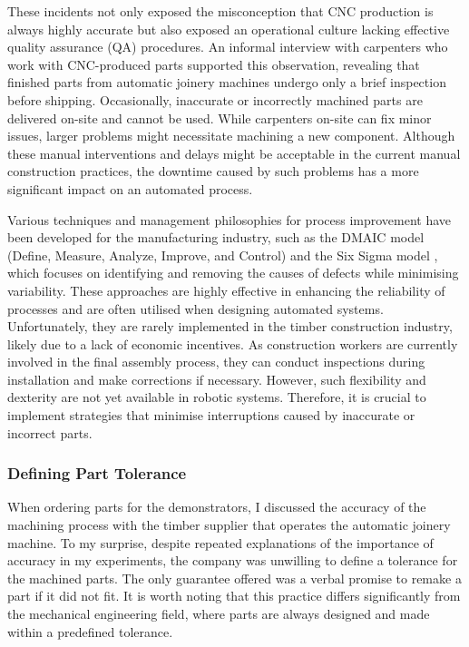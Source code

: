These incidents not only exposed the misconception that CNC production is always highly accurate but also exposed an operational culture lacking effective quality assurance (QA) procedures. An informal interview with carpenters who work with CNC-produced parts supported this observation, revealing that finished parts from automatic joinery machines undergo only a brief inspection before shipping. Occasionally, inaccurate or incorrectly machined parts are delivered on-site and cannot be used. While carpenters on-site can fix minor issues, larger problems might necessitate machining a new component. Although these manual interventions and delays might be acceptable in the current manual construction practices, the downtime caused by such problems has a more significant impact on an automated process.

Various techniques and management philosophies for process improvement have been developed for the manufacturing industry, such as the DMAIC model (Define, Measure, Analyze, Improve, and Control) and the Six Sigma model \parencite{tsungSixSigma2023}, which focuses on identifying and removing the causes of defects while minimising variability. These approaches are highly effective in enhancing the reliability of processes and are often utilised when designing automated systems. Unfortunately, they are rarely implemented in the timber construction industry, likely due to a lack of economic incentives. As construction workers are currently involved in the final assembly process, they can conduct inspections during installation and make corrections if necessary. However, such flexibility and dexterity are not yet available in robotic systems. Therefore, it is crucial to implement strategies that minimise interruptions caused by inaccurate or incorrect parts.

\subsubsection{Defining Part Tolerance}
\label{subsubsection:new-hypo-defining-part-tolerance}

When ordering parts for the demonstrators, I discussed the accuracy of the machining process with the timber supplier that operates the automatic joinery machine. To my surprise, despite repeated explanations of the importance of accuracy in my experiments, the company was unwilling to define a tolerance for the machined parts. The only guarantee offered was a verbal promise to remake a part if it did not fit. It is worth noting that this practice differs significantly from the mechanical engineering field, where parts are always designed and made within a predefined tolerance. 

